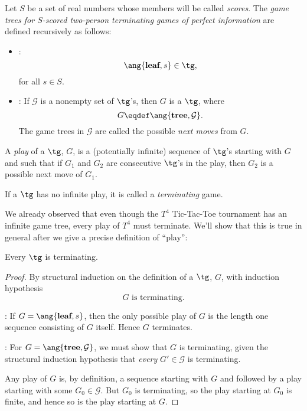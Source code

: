 \begin{definition}
\begin{definition}\label{tgdef}
  Let $S$ be a set of real numbers whose members will be called
  \emph{scores}. The \emph{game trees for $S$-scored two-person
    terminating games of perfect information} are defined recursively as
  follows:
\begin{itemize}

\item {}:
\[
\ang{\textbf{leaf}, s} \in \tg,
\]
for all $s \in S$.

\item {}:
If $\mathcal{G}$ is a nonempty set of
$\tg$'s, then $G$ is a $\tg$, where
\[
G \eqdef \ang{\textbf{tree},\mathcal{G}}.
\]
The game trees in $\mathcal{G}$ are called the possible \emph{next moves}
from $G$.
\end{itemize}

A \emph{play} of a $\tg$, $G$, is a (potentially infinite) sequence of
$\tg$'s starting with $G$ and such that if $G_1$ and $G_2$ are consecutive
$\tg$'s in the play, then $G_2$ is a possible next move of $G_1$.

If a $\tg$ has no infinite play, it is called a \emph{terminating} game.
\end{definition}

We already observed that even though the $T^4$ Tic-Tac-Toe tournament has
an infinite game tree, every play of $T^4$ must terminate.  We'll show
that this is true in general after we give a precise definition of
``play'':

\begin{theorem}
Every $\tg$ is terminating.
\end{theorem}

\begin{proof}
By structural induction on the definition of a $\tg$, $G$, with induction
hypothesis
\[
G \text{ is terminating}.
\]

: If $G = \ang{\textbf{leaf}, s}$, then the only
possible play of $G$ is the length one sequence consisting of $G$ itself.
Hence $G$ terminates.

: For $G = \ang{\textbf{tree},\mathcal{G}}$, we
must show that $G$ is terminating, given the structural induction
hypothesis that \emph{every} $G' \in \mathcal{G}$ is terminating.

Any play of $G$ is, by definition, a sequence starting with $G$ and
followed by a play starting with some $G_0 \in \mathcal{G}$.  But $G_0$ is
terminating, so the play starting at $G_0$ is finite, and hence so is the
play starting at $G$.


\end{proof}
\end{definition}
